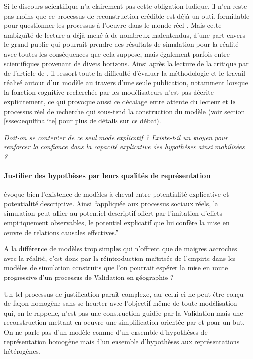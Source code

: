 Si le discours scientifique n'a clairement pas cette obligation ludique, il n'en reste pas moins que ce processus de reconstruction crédible est déjà un outil formidable pour questionner les processus à l'oeuvre dans le monde réel . Mais cette ambiguïté de lecture a déjà mené à de nombreux malentendus, d'une part envers le grand public \autocites{Forrester2007,Deffuant2003} qui pourrait prendre des résultats de simulation pour la réalité avec toutes les conséquences que cela suppose, mais également parfois entre scientifiques provenant de divers horizons. Ainsi après la lecture de la critique par \textcite{Chattoe2011} de l'article de \textcite{Yanoff2008}, il ressort toute la difficulté d'évaluer la méthodologie et le travail réalisé autour d'un modèle au travers d'une seule publication, notamment lorsque la fonction cognitive recherchée par les modélisateurs n'est pas décrite explicitement, ce qui provoque aussi ce décalage entre attente du lecteur et le processus réel de recherche qui sous-tend la construction du modèle (voir section \ref{sssec:equifinalite} pour plus de détails sur ce débat).

\textit{Doit-on se contenter de ce seul mode explicatif ? Existe-t-il un moyen pour renforcer la confiance dans la capacité explicative des hypothèses ainsi mobilisées ? }

\paragraph{Justifier des hypothèses par leurs qualités de représentation}
\label{justifier_hypothese}

\textcite{Bulle2005} évoque bien l'existence de modèles à cheval entre potentialité explicative et potentialité descriptive. Ainsi \enquote{appliquée aux processus sociaux réels, la simulation peut allier au potentiel descriptif offert par l’imitation d’effets empiriquement observables, le potentiel explicatif que lui confère la mise en œuvre de relations causales effectives.}

A la différence de modèles trop simples qui n'offrent que de maigres accroches avec la réalité, c'est donc par la réintroduction maîtrisée de l'empirie dans les modèles de simulation construits que l'on pourrait espérer la mise en route progressive d'un processus de Validation en géographie ?

Un tel processus de justification paraît complexe, car celui-ci ne peut être conçu de façon homogène sans se heurter avec l'objectif même de toute modélisation qui, on le rappelle, n'est pas une construction guidée par la Validation mais une reconstruction mettant en oeuvre une simplification orientée par et pour un but. On ne parle pas d'un modèle comme d'un ensemble d'hypothèses de représentation homogène mais d'un ensemble d'hypothèses aux représentations hétérogènes.

